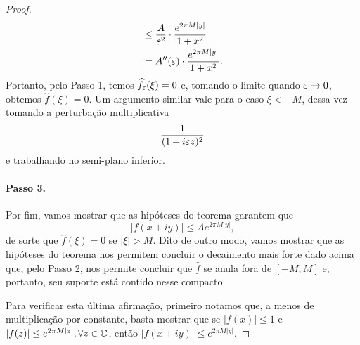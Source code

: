 \begin{proof}
\begin{align*}
                &\leq \frac{A}{\varepsilon^2}\cdot\frac{e^{2\pi M|y|}}{1 + x^2} \\
                &= A''(\varepsilon)\cdot \frac{e^{2\pi M|y|}}{1 + x^2}.
            \end{align*}
            Portanto, pelo Passo 1, temos $\widehat{f_{\varepsilon}}(\xi) = 0$ e, tomando o limite quando
            $\varepsilon\to 0$, obtemos $\widehat{f}(\xi) = 0$. Um argumento similar vale para o caso
            $\xi < -M$, dessa vez tomando a perturbação multiplicativa
            \begin{equation*}
                \frac{1}{(1 + i\varepsilon z)^2}
            \end{equation*}
            e trabalhando no semi-plano inferior.
            \paragraph{Passo 3.} Por fim, vamos mostrar que as hipóteses
            do teorema garantem que
            \begin{equation*}
                |f(x+iy)| \leq Ae^{2\pi M|y|},
            \end{equation*}
            de sorte que $\widehat{f}(\xi) = 0$ se $|\xi| > M$. Dito
            de outro modo, vamos mostrar que as hipóteses do teorema
            nos permitem concluir o decaimento mais forte dado acima
            que, pelo Passo 2, nos permite concluir que $\widehat{f}$
            se anula fora de $[-M,M]$ e, portanto, seu suporte está
            contido nesse compacto.
            
            Para verificar esta última afirmação, primeiro notamos que,
            a menos de multiplicação por constante, basta mostrar que se
            $|f(x)| \leq 1$ e $|f(z)| \leq e^{2\pi M|z|}, \forall z\in\mathbb{C}$,
            então $|f(x+iy)| \leq e^{2\pi M|y|}$.
            

\end{proof}
